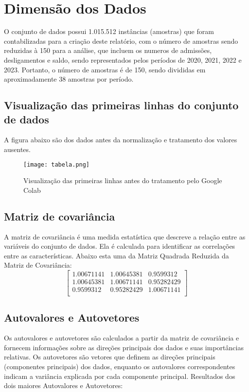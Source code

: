 \documentclass{article}
\begin{document}
\section{Dimensão dos Dados}

O conjunto de dados possui 1.015.512 instâncias (amostras) que foram contabilizadas para a criação deste relatório, com o número de amostras sendo reduzidas à 150 para a análise, que incluem os numeros de admissões, desligamentos e saldo, sendo representados pelos períodos de 2020, 2021, 2022 e 2023. Portanto, o número de amostras é de 150, sendo divididas em aproximadamente 38 amostras por período.


\subsection{Visualização das primeiras linhas do conjunto de dados}
A figura abaixo são dos dados antes da normalização e tratamento dos valores ausentes.
\begin{figure}
\centering
\texttt{[image: tabela.png]}
\caption{\label{fig:frog}Visualização das primeiras linhas antes do tratamento pelo Google Colab}
\end{figure}

\newpage
\subsection{Matriz de covariância}

A matriz de covariância é uma medida estatística que descreve a relação entre as variáveis do conjunto de dados. Ela é calculada para identificar as correlações entre as características. 
Abaixo esta uma da Matriz Quadrada Reduzida da Matriz de Covariância:
\[
\begin{bmatrix}
1.00671141 & 1.00645381 & 0.9599312 \\
1.00645381 & 1.00671141 & 0.95282429 \\
0.9599312 & 0.95282429 & 1.00671141 \\
\end{bmatrix}
\]

\subsection{Autovalores e Autovetores}

Os autovalores e autovetores são calculados a partir da matriz de covariância e fornecem informações sobre as direções principais dos dados e suas importâncias relativas. Os autovetores são vetores que definem as direções principais (componentes principais) dos dados, enquanto os autovalores correspondentes indicam a variância explicada por cada componente principal.
Resultados dos dois maiores Autovalores e Autovetores:\\
\end{document}
